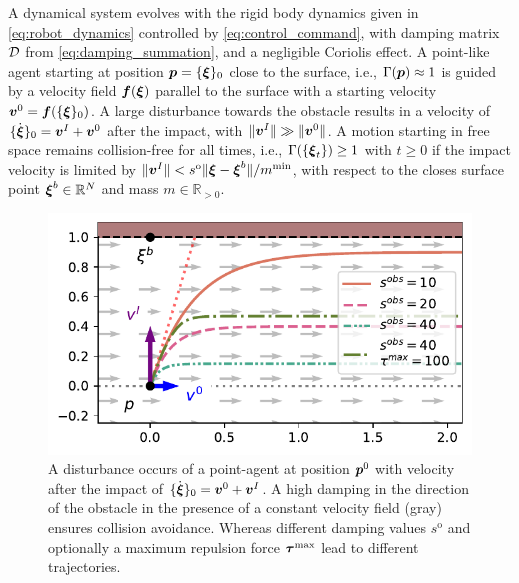 \begin{lemma}
	A dynamical system evolves with the rigid body dynamics given in \eqref{eq:robot_dynamics} controlled by \eqref{eq:control_command}, with damping matrix $\mathcal{D}$ from \eqref{eq:damping_summation}, and a negligible Coriolis effect.
    A point-like agent starting at position $\boldsymbol{p} = \{{\boldsymbol{\xi}}\}_0$ close to the surface, i.e., $\Gamma( \boldsymbol{p}) \approx 1$ is guided by a velocity field $\boldsymbol{f}(\boldsymbol{\xi})$ parallel to the surface with a starting velocity $\boldsymbol{v}^0= \boldsymbol{f}(\{{\boldsymbol{\xi}}\}_0)$.
    A large disturbance towards the obstacle results in a velocity of $\{\dot{\boldsymbol{\xi}}\}_0 = \boldsymbol{v}^I +  \boldsymbol{v}^0$ after the impact, with $\| \boldsymbol{v}^I \| \gg \| \boldsymbol{v}^0 \|$.
	A motion starting in free space remains collision-free for all times, i.e., $\Gamma( \{\boldsymbol{\xi}_t\}) \geq 1$ with $t \geq 0$ if the impact velocity is limited by $\| \boldsymbol{v}^I\| < s^{\mathrm{o}} \| \boldsymbol{\xi} - \boldsymbol{\xi}^b \| / m^{\mathrm{min}}$, with respect to the closes surface point $\boldsymbol{\xi}^b \in \mathbb{R}^N$ and mass $m \in \mathbb{R}_{>0}$.
\end{lemma}


\begin{figure}[htb]
\centering
  \centerline{\includegraphics[width=0.99\columnwidth]{figures/parallel_avoidance_obstacle}}
  \caption{A disturbance occurs of a point-agent at position $\boldsymbol{p}^0$ with velocity after the impact of $\{ \dot{\boldsymbol{\xi}} \}_0 = \boldsymbol{v}^0 + \boldsymbol{v}^I$. A high damping in the direction of the obstacle in the presence of a constant velocity field (gray) ensures collision avoidance. Whereas different damping values $s^{\mathrm{o}}$ and optionally a maximum repulsion force $\boldsymbol{\tau}^{\mathrm{max}}$ lead to different trajectories.}
  \label{fig:disturbance_with_parallel_velocity}
\end{figure}
    
